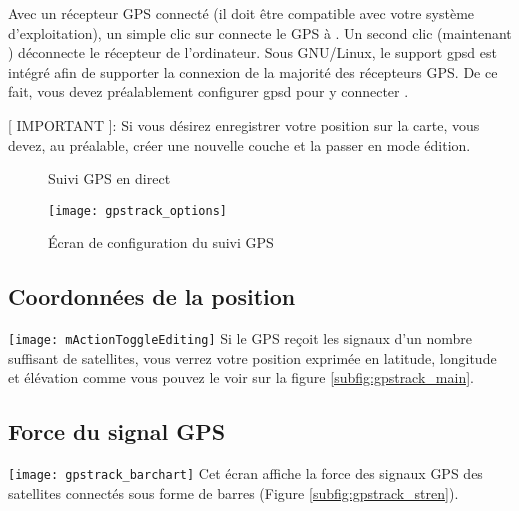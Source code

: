 Avec un récepteur GPS connecté (il doit être compatible avec votre système d'exploitation), un simple clic sur  connecte le GPS à \qg. Un second clic (maintenant ) déconnecte le récepteur de l'ordinateur. Sous GNU/Linux, le support gpsd est intégré afin de supporter la connexion de la majorité des récepteurs GPS. De ce fait, vous devez préalablement configurer gpsd pour y connecter \qg.

[ IMPORTANT ]: Si vous désirez enregistrer votre position sur la carte, vous devez, au préalable, créer une nouvelle couche et la passer en mode édition.

\begin{figure}[ht]
\centering
     \hspace{0.33cm}
     \hspace{0.33cm}
\caption{Suivi GPS en direct \nixcaption} \label{fig:gpstrack_live}
\end{figure}

\begin{figure}[ht]
   \centering
   \texttt{[image: gpstrack\_options]}
   \caption{Écran de configuration du suivi GPS \nixcaption}
   \label{fig:gpstrack_options}
\end{figure}

\subsection{Coordonnées de la position}
\texttt{[image: mActionToggleEditing]} Si le GPS reçoit les signaux d'un nombre suffisant de satellites, vous verrez votre position exprimée en latitude, longitude et élévation comme vous pouvez le voir sur la figure \ref{subfig:gpstrack_main}.

\subsection{Force du signal GPS}
\texttt{[image: gpstrack\_barchart]} Cet écran affiche la force des signaux GPS des satellites connectés sous forme de barres (Figure \ref{subfig:gpstrack_stren}).

